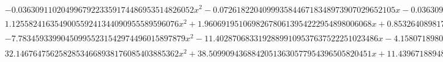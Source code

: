 \documentclass{article}
\begin{document}
\begin{landscape}
\begin{eqnarray*}
\begin{array}{cc}
\begin{array}{cc}
 -0.03630911020499679223359174486953514826052 x^2-0.07261822040999358446718348973907029652105 x-0.03630911020499679223359174486953514826052 & x\geq -1\land x<-\frac{7}{8} \\
 1.125582416354900559241344090955589596076 x^2+1.960691951069826780613954222954898006068 x+0.8532640898174246174894060044340759841223 & x\geq -\frac{7}{8}\land x<-\frac{3}{4} \\
 -7.783459339904509955231542974496015897879 x^2-11.40287068331928899109537637522251023486 x-4.158071898078493796901592969882452106227 & x\geq -\frac{3}{4}\land x<-\frac{5}{8} \\
 32.14676475625828534668938176085403885362 x^2+38.50990943688420513630577954396505820451 x+11.43967188948509811791126825486366303108 & x\geq -\frac{5}{8}\land x<-\frac{1}{2}
\end{array}

\end{array}\end{eqnarray*}
\end{landscape}
\end{document}
